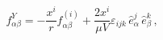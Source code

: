 \begin{equation}\label{fy}
f^Y_{\alpha\beta} 
= - \frac{x^i}{r}f^{(i)}_{\alpha\beta} +\frac{2 x^i}{\mu V}\varepsilon_{ijk} 
\,{\hat e}^j_{\alpha} 
\,{\hat e}^k_{\beta}\,,
\end{equation}


